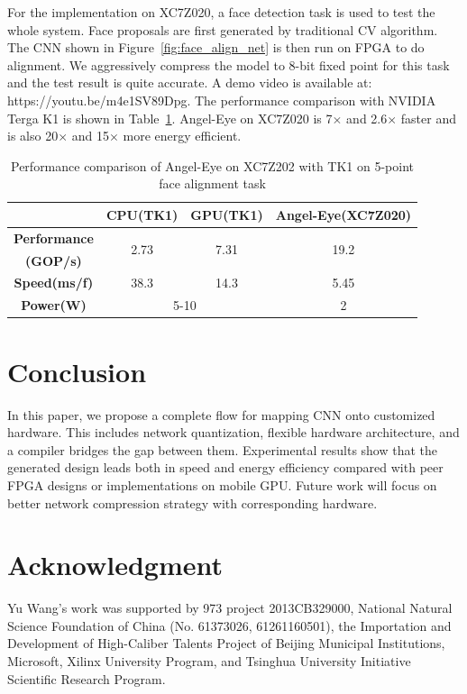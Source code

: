 \documentclass[10pt, conference, compsocconf]{IEEEtran}
\begin{document}
For the implementation on XC7Z020, a face detection task is used to test the whole system. Face proposals are first generated by traditional CV algorithm. The CNN shown in Figure~\ref{fig:face_align_net} is then run on FPGA to do alignment. We aggressively compress the model to 8-bit fixed point for this task and the test result is quite accurate. A demo video is available at: https://youtu.be/m4e1SV89Dpg. The performance comparison with NVIDIA Terga K1 is shown in Table~\ref{tab:perf7020}. Angel-Eye on XC7Z020 is 7$\times$ and 2.6$\times$ faster and is also 20$\times$ and 15$\times$ more energy efficient.
\begin{table}[t]
    \centering
    \caption{Performance comparison of Angel-Eye on XC7Z202 with TK1 on 5-point face alignment task}
    \label{tab:perf7020}
    \scriptsize
    \begin{tabular}{|c|c|c|c|} \hline
        & CPU(TK1) & GPU(TK1) & Angel-Eye(XC7Z020) \\ \hline
        \bf{Performance} & \multirow{2}{*}{2.73} & \multirow{2}{*}{7.31} &
        \multirow{2}{*}{19.2} \\
        \bf{(GOP/s)} & & & \\ \hline
        \bf{Speed(ms/f)} & 38.3 & 14.3 & 5.45 \\ \hline
        \bf{Power(W)} & \multicolumn{2}{c|}{5-10} & 2 \\ \hline
    \end{tabular}
\end{table}

\section{Conclusion}\label{sec:conclusion}
In this paper, we propose a complete flow for mapping CNN onto customized hardware. This includes network quantization, flexible hardware architecture, and a compiler bridges the gap between them. Experimental results show that the generated design leads both in speed and energy efficiency compared with peer FPGA designs or implementations on mobile GPU. Future work will focus on better network compression strategy with corresponding hardware.

\section*{Acknowledgment}
Yu Wang's work was supported by 973 project 2013CB329000, National Natural Science Foundation of China (No. 61373026, 61261160501), the Importation and Development of High-Caliber Talents Project of Beijing Municipal Institutions, Microsoft, Xilinx University Program, and Tsinghua University Initiative Scientific Research Program.


\small


\end{document}
